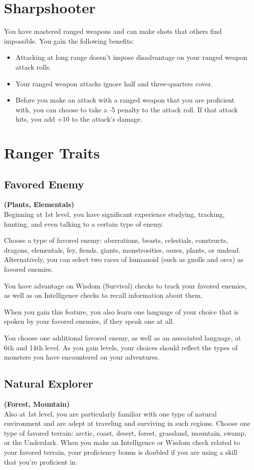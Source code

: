 {\section*{Sharpshooter}
You have mastered ranged weapons and can make shots that others find impossible. You gain the following benefits:
\begin{itemize}
	\item Attacking at long range doesn't impose disadvantage on your ranged weapon attack rolls.
	\item Your ranged weapon attacks ignore half and three-quarters cover.
	\item Before you make an attack with a ranged weapon that you are proficient with, you can choose to take a -5 penalty to the attack roll. If that attack hits, you add +10 to the attack's damage.
\end{itemize}

\section*{Ranger Traits}
\subsection*{Favored Enemy}
\textbf{(Plants, Elementals)}\\
Beginning at 1st level, you have significant experience studying, tracking, hunting, and even talking to a certain type of enemy.

Choose a type of favored enemy: aberrations, beasts, celestials, constructs, dragons, elementals, fey, fiends, giants, monstrosities, oozes, plants, or undead. Alternatively, you can select two races of humanoid (such as gnolls and orcs) as favored enemies.

You have advantage on Wisdom (Survival) checks to track your favored enemies, as well as on Intelligence checks to recall information about them.

When you gain this feature, you also learn one language of your choice that is spoken by your favored enemies, if they speak one at all.

You choose one additional favored enemy, as well as an associated language, at 6th and 14th level. As you gain levels, your choices should reflect the types of monsters you have encountered on your adventures.
\subsection*{Natural Explorer}
\textbf{(Forest, Mountain)}\\
Also at 1st level, you are particularly familiar with one type of natural environment and are adept at traveling and surviving in such regions. Choose one type of favored terrain: arctic, coast, desert, forest, grassland, mountain, swamp, or the Underdark. When you make an Intelligence or Wisdom check related to your favored terrain, your proficiency bonus is doubled if you are using a skill that you’re proficient in.

}

